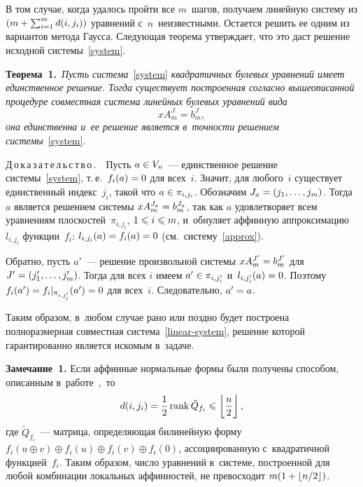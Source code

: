 \begin{multicols}{2}
В том случае, когда удалось пройти все $m$~шагов, получаем линейную систему из 
$(m\hm+\sum\nolimits_{i=1}^m d(i,j_i))$ уравнений с~$n$~неизвестными.
Остается решить ее одним из вариантов метода Гаусса. Следующая тео\-ре\-ма 
утверждает, что это даст решение исходной системы~\eqref{system}.

\smallskip

\noindent
\textbf{Теорема~1.}\
\textit{Пусть система}~\eqref{system} \textit{квадратичных булевых уравнений имеет 
единственное решение.
    Тогда существует построенная согласно вышеописанной процедуре совместная 
система линейных булевых уравнений вида}
 \begin{equation}\label{linear-system}
    xA^{J}_m=b^{J}_m,
 \end{equation}
 \textit{она единственна и~ее решение является в~точности решением 
системы}~\eqref{system}.

\smallskip

\noindent
Д\,о\,к\,а\,з\,а\,т\,е\,л\,ь\,с\,т\,в\,о\,.\ \
    Пусть $a\hm\in V_n$~--- единственное решение системы~\eqref{system}, т.\,е.\ 
$f_i(a)\hm=0$ для всех~$i$.
    Значит, для любого~$i$ существует единственный индекс~$j_i$, такой что 
$a\hm\in\pi_{i,j_i}$.
    Обозначим $J_a\hm=(j_1,\ldots,j_m)$. Тогда~$a$ является решением системы 
$xA^{J_a}_m\hm=b^{J_a}_m$,
    так как $a$ удовлетворяет всем уравнениям плоскостей~$\pi_{i,j_i}$, $1\hm\leqslant 
i\hm\leqslant m$, и~обнуляет аффинную аппроксимацию $l_{i,j_i}$ функции~$f_i$: 
$l_{i,j_i}(a)\hm=f_i(a)\hm=0$ (см.\ систему~\eqref{approx}).

    Обратно, пусть $a'$~--- решение произвольной сис\-те\-мы $xA^{J'}_m\hm=b^{J'}_m$ 
для $J'\hm=(j'_1,\ldots,j'_m)$.
    Тогда для всех $i$ имеем $a'\hm\in\pi_{i,j'_i}$ и~$l_{i,j'_i}(a)\hm=0$. Поэтому 
$f_i(a')\hm=f_i|_{\pi_{i,j'_i}}(a')\hm=0$ для всех~$i$.
    Следовательно, $a'\hm=a$.

\smallskip

Таким образом, в~любом случае рано или поздно будет построена полноразмерная 
совместная система~\eqref{linear-system}, решение которой гарантированно 
является искомым в~задаче.

\smallskip

\noindent
\textbf{Замечание~1.}
    Если аффинные нормальные формы были получены способом, описанным 
    в~работе~\cite{LSF2019},~то
    $$
    d(i,j_i)=\displaystyle\frac{\displaystyle 1\mathstrut}{\displaystyle 2\mathstrut}\,\mathrm{rank}\,\tilde{Q}_{f_i}\leqslant\left\lfloor\displaystyle\frac{\displaystyle n\mathstrut}{\displaystyle 2\mathstrut}\right
    \rfloor,
    $$
    где $\tilde{Q}_{f_i}$~--- мат\-ри\-ца, определяющая билинейную форму 
$f_i(u\oplus v)\oplus f_i(u)\oplus f_i(v)\oplus f_i({0})$, 
ассоциированную с~квадратичной функцией~$f_i$.
    Таким образом, число уравнений в~системе, построенной для любой комбинации 
локальных аффинностей, не превосходит $m(1\hm+\lfloor {n}/{2}\rfloor)$.



\end{multicols}
